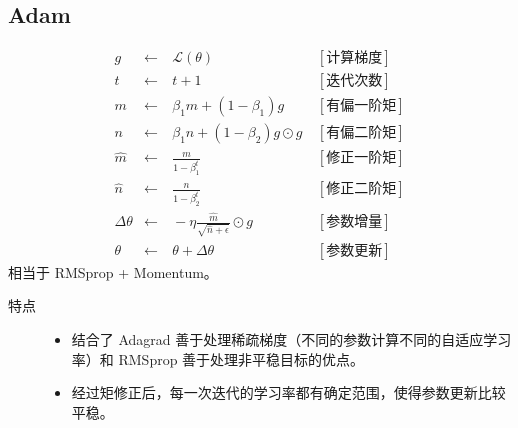 \documentclass[letterpaper,10pt,english]{sphinxmanual}
\begin{document}
\subsection{Adam}
\label{\detokenize{deepLearning/08_optimizer:adam}}\begin{equation*}
\begin{split}g & \leftarrow &\ \mathcal{L}(\theta) &\  [\text{计算梯度}] \\
t & \leftarrow &\ t + 1 &\  [\text{迭代次数}] \\
m & \leftarrow &\ \beta_1 m + (1 - \beta_1) g &\  [\text{有偏一阶矩}] \\
n & \leftarrow &\ \beta_1 n + (1 - \beta_2) g \odot g &\  [\text{有偏二阶矩}] \\
\hat{m} & \leftarrow &\ \frac{m}{1 - \beta_1^t} &\  [\text{修正一阶矩}] \\
\hat{n} & \leftarrow &\ \frac{n}{1 - \beta_2^t} &\  [\text{修正二阶矩}] \\
\Delta \theta & \leftarrow &\  - \eta \frac{\hat{m}}{\sqrt{\hat{n}+\epsilon}} \odot g &\ [\text{参数增量}] \\
\theta & \leftarrow &\  \theta + \Delta \theta &\ [\text{参数更新}]\end{split}
\end{equation*}
相当于 RMSprop + Momentum。
\begin{description}
\item[{特点}] \leavevmode\begin{itemize}
\item {} 
结合了 Adagrad 善于处理稀疏梯度（不同的参数计算不同的自适应学习率）和 RMSprop 善于处理非平稳目标的优点。

\item {} 
经过矩修正后，每一次迭代的学习率都有确定范围，使得参数更新比较平稳。

\end{itemize}

\end{description}
\end{document}
